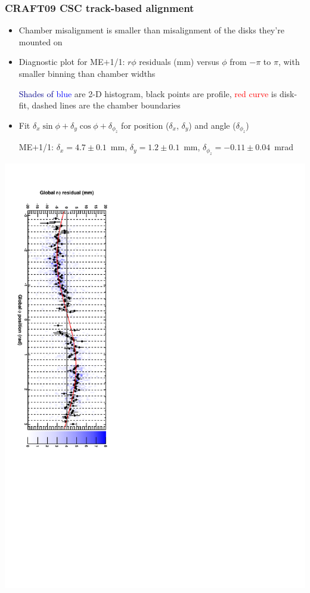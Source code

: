 \documentclass[compress]{beamer}
\begin{document}
\begin{frame}
\frametitle{CRAFT09 CSC track-based alignment}

\begin{itemize}
\item Chamber misalignment is smaller than misalignment of the disks they're mounted on
\item Diagnostic plot for ME$+$1/1: $r\phi$ residuals (mm) versus $\phi$
  from $-\pi$ to $\pi$, with smaller binning than chamber widths

  {\scriptsize \textcolor{darkblue}{Shades of} \textcolor{blue}{blue} are 2-D histogram, black points are profile, \textcolor{red}{red curve} is disk-fit, dashed lines are the chamber boundaries}

\item Fit $\delta_x\sin\phi+\delta_y\cos\phi+\delta_{\phi_z}$ for position {\scriptsize ($\delta_x$, $\delta_y$)} and angle {\scriptsize ($\delta_{\phi_z}$)}

  {\scriptsize ME$+$1/1: $\delta_x = 4.7 \pm 0.1$~mm, $\delta_y = 1.2 \pm 0.1$~mm, $\delta_{\phi_z} = -0.11 \pm 0.04$~mrad}
\end{itemize}

\mbox{\hspace{-1 cm}\includegraphics[height=1.2\linewidth, angle=90]{demonstrate_2009.pdf}}
\end{frame}
\end{document}
